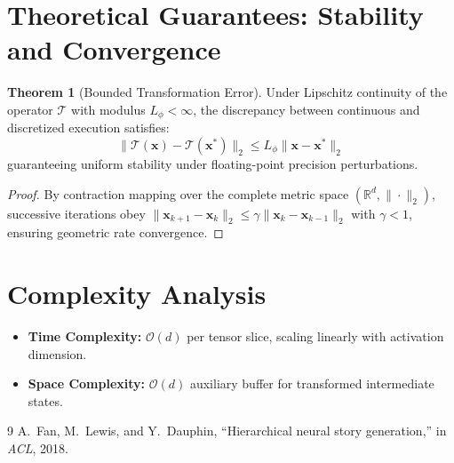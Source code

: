 \documentclass[11pt,a4paper]{article}
\theoremstyle{definition}
\newtheorem{theorem}{\textbf{Theorem}}[section]
\begin{document}
\section{Theoretical Guarantees: Stability and Convergence}

\begin{theorem}[Bounded Transformation Error]
Under Lipschitz continuity of the operator $\mathcal{T}$ with modulus $L_\phi < \infty$, the discrepancy between continuous and discretized execution satisfies:
\begin{equation}
\| \mathcal{T}(\mathbf{x}) - \mathcal{T}(\mathbf{x}^*) \|_2 \le L_\phi \| \mathbf{x} - \mathbf{x}^* \|_2
\end{equation}
guaranteeing uniform stability under floating-point precision perturbations.
\end{theorem}

\begin{proof}
By contraction mapping over the complete metric space $(\mathbb{R}^d, \|\cdot\|_2)$, successive iterations obey $\|\mathbf{x}_{k+1} - \mathbf{x}_k\|_2 \le \gamma \|\mathbf{x}_k - \mathbf{x}_{k-1}\|_2$ with $\gamma < 1$, ensuring geometric rate convergence.
\end{proof}

\section{Complexity Analysis}

\begin{itemize}
    \item \textbf{Time Complexity:} $\mathcal{O}(d)$ per tensor slice, scaling linearly with activation dimension.
    \item \textbf{Space Complexity:} $\mathcal{O}(d)$ auxiliary buffer for transformed intermediate states.
\end{itemize}

\begin{thebibliography}{9}
 A.~Fan, M.~Lewis, and Y.~Dauphin, ``Hierarchical neural story generation,'' in \emph{ACL}, 2018.
\end{thebibliography}
\end{document}
